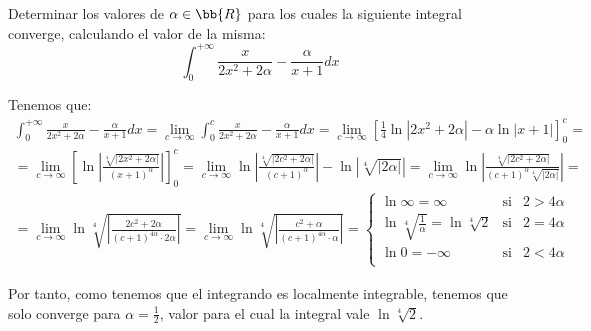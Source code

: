 \begin{ejercicio}
    Determinar los valores de $\alpha\in \bb{R}$ para los cuales la siguiente integral converge, calculando el valor de la misma:
    \begin{equation*}
        \int_0^{+\infty} \frac{x}{2x^2+2\alpha}-\frac{\alpha}{x+1}dx
    \end{equation*}

    Tenemos que:
    \begin{multline*}
        \int_0^{+\infty} \frac{x}{2x^2+2\alpha}-\frac{\alpha}{x+1}dx
        = \lim_{c\to \infty} \int_0^{c} \frac{x}{2x^2+2\alpha}-\frac{\alpha}{x+1}dx
        = \lim_{c\to \infty} \left[\frac{1}{4}\ln |2x^2+2\alpha| - \alpha \ln |x+1|\right]_0^c
        =\\=
        \lim_{c\to \infty} \left[ \ln \left|\frac{\sqrt[4]{|2x^2+2\alpha|}}{(x+1)^\alpha}\right|\right]_0^c
        = \lim_{c\to \infty} \ln \left|\frac{\sqrt[4]{|2c^2+2\alpha|}}{(c+1)^\alpha}\right| - \ln \left|\sqrt[4]{|2\alpha|}\right|
        = \lim_{c\to \infty} \ln \left|\frac{\sqrt[4]{|2c^2+2\alpha|}}{(c+1)^\alpha\sqrt[4]{|2\alpha|}}\right|
        =\\=
        \lim_{c\to \infty} \ln \sqrt[4]{\left|\frac{2c^2+2\alpha}{(c+1)^{4\alpha}\cdot  2\alpha}\right|}
        = \lim_{c\to \infty} \ln \sqrt[4]{\left|\frac{c^2+\alpha}{(c+1)^{4\alpha}\cdot  \alpha}\right|} = \left\{
        \begin{array}{lll}
            \ln \infty = \infty & \text{si} & 2>4\alpha \\
            \ln \sqrt[4]{\frac{1}{\alpha}} = \ln \sqrt[4]{2} & \text{si} & 2=4\alpha \\
            \ln 0=-\infty & \text{si} & 2<4\alpha \\
        \end{array}
        \right.
    \end{multline*}

    Por tanto, como tenemos que el integrando es localmente integrable, tenemos que solo converge para $\alpha=\frac{1}{2}$, valor para el cual la integral vale $\ln \sqrt[4]{2}$.
\end{ejercicio}

